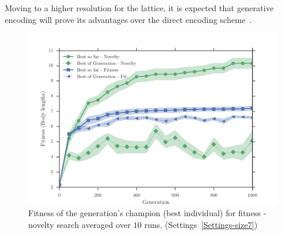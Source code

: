 Moving to a higher resolution for the lattice, it is expected that generative encoding will prove its advantages over the direct encoding scheme~\citep{cheney2013unshackling,stanley2007compositional}. 
\begin{figure}[t!]
\centering
\includegraphics[width=1.0\textwidth]{../Figures/Results/AvgGenerChampNoveltyFitnessSize7.pdf}
\caption{Fitness of the generation's champion (best individual) for fitness - novelty search averaged over $10$ runs. (Settings~\ref{Settings-size7})}
\label{fig:AvgGenerChampNoveltyFitnessSize7}
\end{figure}
